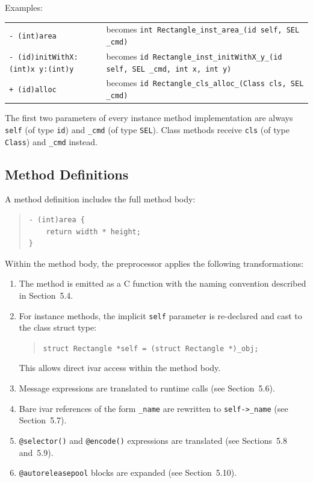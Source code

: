 \documentclass[11pt,twoside]{article}
\begin{document}
Examples:

\medskip
\noindent
\begin{tabular}{ll}
{\tt - (int)area}
  & becomes {\tt int Rectangle\_inst\_area\_(id self, SEL \_cmd)} \\[4pt]
{\tt - (id)initWithX:(int)x y:(int)y}
  & becomes {\tt id Rectangle\_inst\_initWithX\_y\_(id self, SEL \_cmd, int x, int y)}
  \\[4pt]
{\tt + (id)alloc}
  & becomes {\tt id Rectangle\_cls\_alloc\_(Class cls, SEL \_cmd)} \\
\end{tabular}

The first two parameters of every instance method implementation are
always {\tt self} (of type {\tt id}) and {\tt \_cmd} (of type {\tt SEL}).
Class methods receive {\tt cls} (of type {\tt Class}) and {\tt \_cmd}
instead.

\subsection{Method Definitions}

A method definition includes the full method body:
\begin{quote}
\begin{verbatim}
- (int)area {
    return width * height;
}
\end{verbatim}
\end{quote}

Within the method body, the preprocessor applies the following
transformations:

\begin{enumerate}
  \item The method is emitted as a C function with the naming
        convention described in Section~5.4.

  \item For instance methods, the implicit {\tt self} parameter is
        re-declared and cast to the class struct type:
        \begin{quote}
        {\tt struct Rectangle *self = (struct Rectangle *)\_obj;}
        \end{quote}
        This allows direct ivar access within the method body.

  \item Message expressions are translated to runtime calls
        (see Section~5.6).

  \item Bare ivar references of the form {\tt \_name} are rewritten to
        {\tt self->\_name} (see Section~5.7).

  \item {\tt @selector()} and {\tt @encode()} expressions are translated
        (see Sections~5.8 and~5.9).

  \item {\tt @autoreleasepool} blocks are expanded (see Section~5.10).
\end{enumerate}
\end{document}
